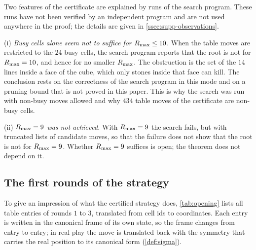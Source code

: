 \begin{remark}\label{rem:observations}
Two features of the certificate are explained by runs of the search program. These runs have not been
verified by an independent program and are not used anywhere in the proof; the details are given in
\cref{ssec:supp-observations}.

(i) \emph{Busy cells alone seem not to suffice for $R_{\max}\le 10$.} When the table moves are restricted to
the $24$ busy cells, the search program reports that the root is not \WON{} for $R_{\max}=10$, and hence for
no smaller $R_{\max}$. The obstruction is the set of the $14$ lines inside a face of the cube, which only
stones inside that face can kill. The conclusion rests on the correctness of the search program in this
mode and on a pruning bound that is not proved in this paper. This is why the search was run with
non-busy moves allowed and why $434$ table moves of the certificate are non-busy cells.

(ii) \emph{$R_{\max}=9$ was not achieved.} With $R_{\max}=9$ the search fails, but with truncated lists of
candidate moves, so that the failure does not show that the root is not \WON{} for $R_{\max}=9$. Whether
$R_{\max}=9$ suffices is open; the theorem does not depend on it.
\end{remark}

\subsection{The first rounds of the strategy}\label{ssec:walk}

To give an impression of what the certified strategy does, \cref{tab:opening} lists all table entries of
rounds $1$ to $3$, translated from cell ids to coordinates. Each entry is written in the canonical frame of
its own state, so the frame changes from entry to entry; in real play the move is translated back with the
symmetry that carries the real position to its canonical form (\cref{def:sigma}).

